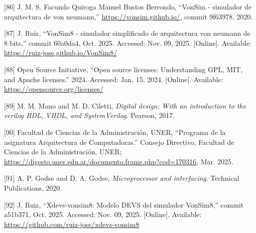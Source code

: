 \documentclass[12pt,oneside]{templates/unerthesis}
\newcommand{\CSLLeftMargin}[1]{#1} %
\newcommand{\CSLRightInline}[1]{#1} %
\newlength{\cslhangindent}
\newenvironment{CSLReferences}[2] %
 {\setlength{\parindent}{0pt}%
  \setlength{\leftskip}{#1 pt\relax}%
  \setlength{\parskip}{#2 pt\relax}%
  \everypar{\setlength{\hangindent}{\cslhangindent}}}
 {\par}
\begin{document}
\begin{CSLReferences}{0}{0}
\leavevmode{}%
\CSLLeftMargin{{[}86{]} }%
\CSLRightInline{J. M. S. Facundo Quiroga Manuel Bustos Berrondo, {``VonSim - simulador de arquitectura de von neumann,''} \url{https://vonsim.github.io/}, commit 9f63978, 2020.}

\leavevmode{}%
\CSLLeftMargin{{[}87{]} }%
\CSLRightInline{J. Ruiz, {``VonSim8 - simulador simplificado de arquitectura von neumann de 8 bits,''} commit 60a0da4, Oct. 2025. Accessed: Nov. 09, 2025. {[}Online{]}. Available: \url{https://ruiz-jose.github.io/VonSim8/}}

\leavevmode{}%
\CSLLeftMargin{{[}88{]} }%
\CSLRightInline{Open Source Initiative, {``Open source licenses: Understanding {GPL}, {MIT}, and {Apache} licenses.''} 2024. Accessed: Jan. 15, 2024. {[}Online{]}. Available: \url{https://opensource.org/licenses/}}

\leavevmode{}%
\CSLLeftMargin{{[}89{]} }%
\CSLRightInline{M. M. Mano and M. D. Ciletti, \emph{Digital design: With an introduction to the verilog HDL, VHDL, and SystemVerilog}. Pearson, 2017.}

\leavevmode{}%
\CSLLeftMargin{{[}90{]} }%
\CSLRightInline{Facultad de Ciencias de la Administración, UNER, {``{Programa de la asignatura Arquitectura de Computadoras}.''} Consejo Directivo, Facultad de Ciencias de la Administración, UNER; \url{https://digesto.uner.edu.ar/documento.frame.php?cod=170316}, Mar. 2025.}

\leavevmode{}%
\CSLLeftMargin{{[}91{]} }%
\CSLRightInline{A. P. Godse and D. A. Godse, \emph{Microprocessor and interfacing}. Technical Publications, 2020.}

\leavevmode{}%
\CSLLeftMargin{{[}92{]} }%
\CSLRightInline{J. Ruiz, {``Xdevs-vonsim8: Modelo DEVS del simulador VonSim8,''} commit a51b371, Oct. 2025. Accessed: Nov. 09, 2025. {[}Online{]}. Available: \url{https://github.com/ruiz-jose/xdevs-vonsim8}}

\end{CSLReferences}

%


\end{document}
